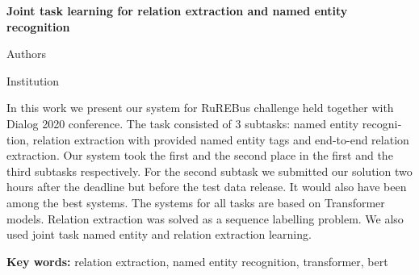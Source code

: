 \documentclass{dialogue}
\begin{document}
	
	\begin{otherlanguage}{english}
		\begin{center}
			{\Large\bfseries{Joint task learning for relation extraction and named entity recognition}}
			
			\medskip
			
			Authors
			
			\medskip
			
			Institution
		\end{center}
		
		In this work we present our system for RuREBus challenge held together with Dialog 2020 conference. The task consisted of 3 subtasks: named entity recognition, relation extraction with provided named entity tags and end-to-end relation extraction. Our system took the first and the second place in the first and the third subtasks respectively. For the second subtask we submitted our solution two hours after the deadline but before the test data release. It would also have been among the best systems. The systems for all tasks are based on Transformer models. Relation extraction was solved as a sequence labelling problem. We also used joint task named entity and relation extraction learning.
		
		\textbf{Key words:} relation extraction, named entity recognition, transformer, bert
	\end{otherlanguage}
	
	\bigskip
	
\end{document}
